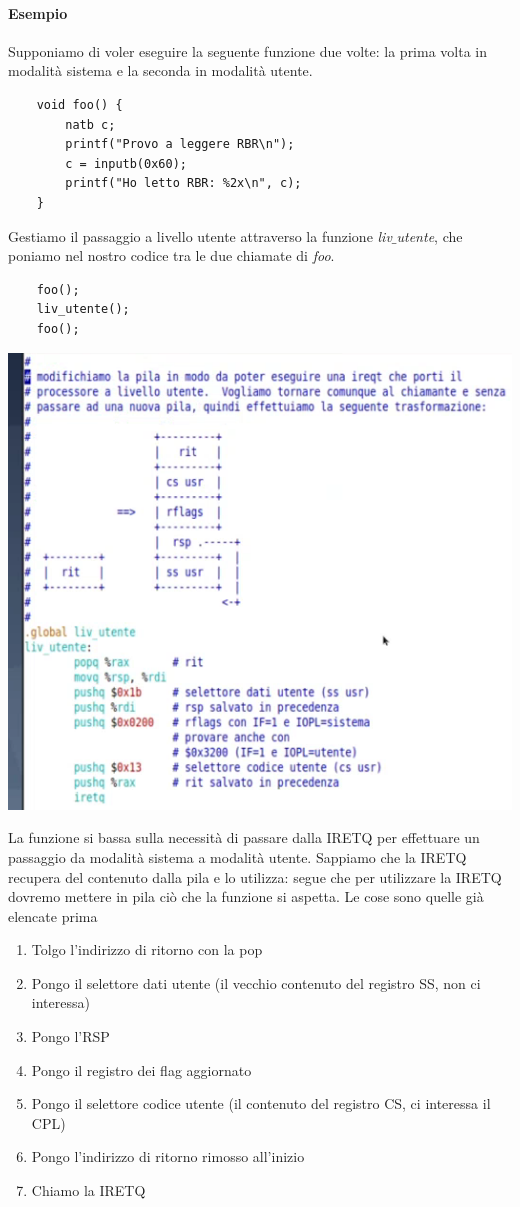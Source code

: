 \paragraph{Esempio} Supponiamo di voler eseguire la seguente funzione due volte: la prima volta in modalità sistema e la seconda in modalità utente.
\begin{verbatim}
	void foo() {
		natb c;
		printf("Provo a leggere RBR\n");
		c = inputb(0x60);
		printf("Ho letto RBR: %2x\n", c);
	}
\end{verbatim}
Gestiamo il passaggio a livello utente attraverso la funzione \emph{liv$\_$utente}, che poniamo nel nostro codice tra le due chiamate di \emph{foo}.
\begin{verbatim}
	foo();
	liv_utente();
	foo();
\end{verbatim}
\begin{center}\includegraphics{img/122.PNG}\end{center}
La funzione si bassa sulla necessità di passare dalla IRETQ per effettuare un passaggio da modalità sistema a modalità utente. Sappiamo che la IRETQ recupera del contenuto dalla pila e lo utilizza: segue che per utilizzare la IRETQ dovremo mettere in pila ciò che la funzione si aspetta. Le cose sono quelle già elencate prima
\begin{enumerate}
	\item Tolgo l'indirizzo di ritorno con la pop
	\item Pongo il selettore dati utente (il vecchio contenuto del registro SS, non ci interessa)
	\item Pongo l'RSP
	\item Pongo il registro dei flag aggiornato
	\item Pongo il selettore codice utente (il contenuto del registro CS, ci interessa il CPL)
	\item Pongo l'indirizzo di ritorno rimosso all'inizio
	\item Chiamo la IRETQ
\end{enumerate}

